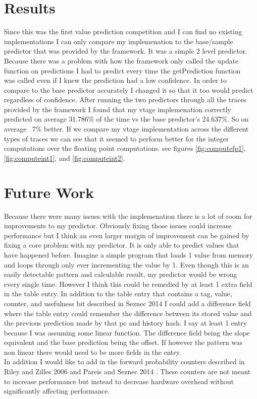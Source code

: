 \documentclass[12pt]{article}
\newcommand\tab[1][1cm]{\hspace*{#1}}
\begin{document}
\begin{multicols}{2}
\section{Results}
\tab Since this was the first value prediction competition and I can find no existing implementations I can only compare my implemenation to the base/sample predictor that was provided by the framework. It was a simple 2 level predictor. Because there was a problem with how the framework only called the update function on predictions I had to predict every time the getPrediction function was called even if I knew the prediction had a low confidence. In order to compare to the base predictor accurately I changed it so that it too would predict regardless of confidence. After running the two predictors through all the traces provided by the framework I found that my vtage implemenation correctly predicted on average 31.786\% of the time vs the base predictor's 24.637\%. So on average ~7\% better. If we compare my vtage implementation across the different types of traces we can see that it seemed to perform better for the integer computations over the floating point computations. see figures \ref{fig:computefp1}, \ref{fig:computeint1}, and \ref{fig:computeint2}.
\section{Future Work}
\tab Because there were many issues with the implemenation there is a lot of room for improvements to my predictor. Obviously fixing those issues could increase performance but I think an even larger margin of improvement can be gained by fixing a core problem with my predictor. It is only able to predict values that have happened before. Imagine a simple program that loads 1 value from memory and loops through only ever incrementing the value by 1. Even though this is an easily detectable pattern and calculable result, my predictor would be wrong every single time. However I think this could be remedied by at least 1 extra field in the table entry. In addition to the table entry that contains a tag, value, counter, and usefulness bit described in Seznec 2014 \cite{Seznec2014} I could add a difference field where the table entry could remember the difference between its stored value and the previous prediction made by that pc and history hash. I say at least 1 entry because I was assuming some linear function. The difference field being the slope equivalent and the base prediction being the offset. If however the pattern was non linear there would need to be more fields in the entry.\\
\tab In addition I would like to add in the forward probability counters described in Riley and Zilles 2006 \cite{Riley2006} and Pareis and Seznec 2014 \cite{Seznec2014}. These counters are not meant to increase performance but instead to decrease hardware overhead without significantly affecting performance.

\end{multicols}
\end{document}

